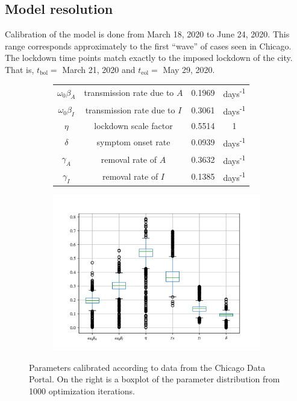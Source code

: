 \documentclass[11pt]{article}
\begin{document}
	\subsection{Model resolution}
		Calibration of the model is done from March 18, 2020 to June 24, 2020.
		This range corresponds approximately to the first ``wave'' of cases seen in Chicago.
		The lockdown time points match exactly to the imposed lockdown of the city.
		That is, $t_\mathrm{bol} =$ March 21, 2020 and $t_\mathrm{eol} =$ May 29, 2020.
		\begin{figure}[h!]
			\centering
			\begin{subfigure}{0.55\textwidth}
				\begin{tabular}{c c c c}
					\hline
					$\omega_0 \beta_A$ & transmission rate due to $A$ & 0.1969 & days\textsuperscript{-1} \\
					$\omega_0 \beta_I$ & transmission rate due to $I$ & 0.3061 & days\textsuperscript{-1} \\
					$\eta$ & lockdown scale factor & 0.5514 & 1 \\
					$\delta$ & symptom onset rate & 0.0939 & days\textsuperscript{-1} \\
					$\gamma_A$ & removal rate of $A$ & 0.3632 & days\textsuperscript{-1} \\
					$\gamma_I$ & removal rate of $I$ & 0.1385 & days\textsuperscript{-1} \\
					\hline
				\end{tabular}
			\end{subfigure}%
			\begin{subfigure}{0.45\textwidth}
				\includegraphics[width=\textwidth]{box-plot.pdf}
			\end{subfigure}
			\caption{Parameters calibrated according to data from the Chicago Data Portal.
				On the right is a boxplot of the parameter distribution from 1000 optimization iterations.}
			\label{fig:params}
		\end{figure}
	
\end{document}
